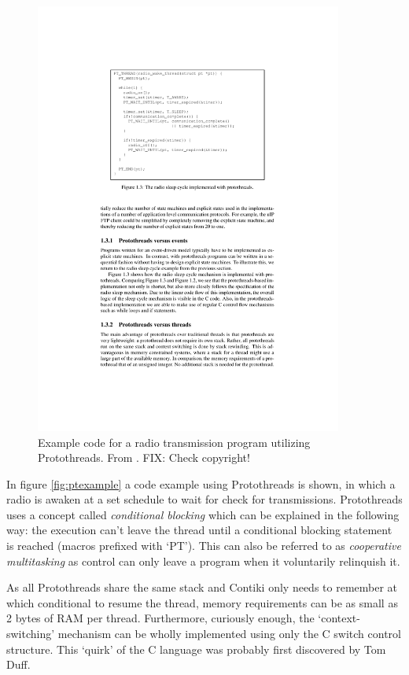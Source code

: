 \documentclass[final,a4paper,twoside,11pt,onecolumn]{report}
\begin{document}
\begin{figure}[h!]
   \includegraphics[width=0.9\textwidth]{dunkels-protothreads-example}
   \caption{Example code for a radio transmission program utilizing Protothreads. From \citep[p.7]{dunkels2005protothreads}. FIX: Check copyright!}
   \label{fig:ptexample}
\end{figure}

In figure \vref{fig:ptexample} a code example using Protothreads is shown, in which a radio is awaken at a set schedule to wait for check for transmissions. Protothreads uses a concept called \emph{conditional blocking} which can be explained in the following way: the execution can't leave the thread until a conditional blocking statement is reached (macros prefixed with `PT'). This can also be referred to as \emph{cooperative multitasking} as control can only leave a program when it voluntarily relinquish it.

As all Protothreads share the same stack and Contiki only needs to remember at which conditional to resume the thread, memory requirements can be as small as 2 bytes of RAM per thread. Furthermore, curiously enough, the `context-switching' mechanism can be wholly implemented using only the C switch control structure. This `quirk' of the C language was probably first discovered by Tom Duff\citep[p.10]{dunkels2005protothreads}\cite{wiki:duffs}.
\end{document}

